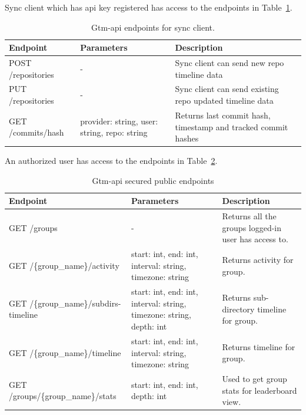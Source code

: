 Sync client which has api key registered has access to the endpoints in Table~\ref{tab:gtm-api-endpoints-for-sync}.
\begin{table}[H]
    \centering
    \begin{tabular}{ | p{5cm} | p{4cm} | p{5cm} |}
        \hline
        Endpoint & Parameters & Description\\
        \hline
        POST /repositories & - & Sync client can send new repo timeline data \\
        \hline
        PUT /repositories & - & Sync client can send existing repo updated timeline data\\
        \hline
        GET /commits/hash & provider: string, user: string, repo: string & Returns last commit hash, timestamp and tracked commit hashes\\
        \hline
    \end{tabular}
    \caption{Gtm-api endpoints for sync client.}
    \label{tab:gtm-api-endpoints-for-sync}
\end{table}

An authorized user has access to the endpoints in Table~\ref{tab:gtm-api-endpoints-secured}.
\begin{table}[H]
    \centering
    \begin{tabular}{ | p{5cm} | p{4cm} | p{5cm} |}
        \hline
        Endpoint & Parameters & Description\\
        \hline
        GET /groups & - & Returns all the groups logged-in user has access to. \\
        \hline
        GET /\{group\_name\}/activity & start: int, end: int, interval: string, timezone: string & Returns activity for group. \\
        \hline
        GET /\{group\_name\}/subdirs-timeline & start: int, end: int, interval: string, timezone: string, depth: int & Returns sub-directory timeline for group. \\
        \hline
        GET /\{group\_name\}/timeline & start: int, end: int, interval: string, timezone: string & Returns timeline for group. \\
        \hline
        GET /groups/\{group\_name\}/stats & start: int, end: int, depth: int & Used to get group stats for leaderboard view.\\
        \hline
    \end{tabular}
    \caption{Gtm-api secured public endpoints}
    \label{tab:gtm-api-endpoints-secured}
\end{table}

